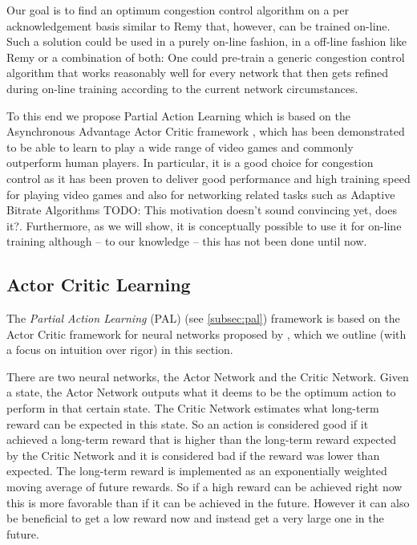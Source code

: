 \documentclass[sigconf]{acmart}
\newcommand\note[2]{{\color{#1}#2}}
\newcommand\todo[1]{{\note{red}{TODO: #1}}}
\begin{document}
Our goal is to find an optimum congestion control algorithm on a per acknowledgement basis similar to Remy that, however, can be trained on-line.  Such a solution could be used in a purely on-line fashion, in a off-line fashion like Remy or a combination of both: One could pre-train a generic congestion control algorithm that works reasonably well for every network that then gets refined during on-line training according to the current network circumstances. 

To this end we propose Partial Action Learning which is based on the Asynchronous Advantage Actor Critic framework \cite{mnih_asynchronous_2016}, which has been demonstrated to be able to learn to play a wide range of video games and commonly outperform human players. In particular, it is a good choice for congestion control as it has been proven to deliver good performance and high training speed for playing video games and also for networking related tasks such as Adaptive Bitrate Algorithms \cite{mao_neural_2017} \todo{This motivation doesn't sound convincing yet, does it?}. Furthermore, as we will show, it is conceptually possible to use it for on-line training although -- to our knowledge -- this has not been done until now. 

\subsection{Actor Critic Learning}
\label{subsec:ac}

The \textit{Partial Action Learning} (PAL) (see \ref{subsec:pal}) framework is based on the Actor Critic framework for neural networks proposed by \citet{mnih_asynchronous_2016}, which we outline (with a focus on intuition over rigor) in this section. 

There are two neural networks, the Actor Network and the Critic Network. Given a state, the Actor Network outputs what it deems to be the optimum action to perform in that certain state. The Critic Network estimates what long-term reward can be expected in this state. So an action is considered good if it achieved a long-term reward that is higher than the long-term reward expected by the Critic Network and it is considered bad if the reward was lower than expected. The long-term reward is implemented as an exponentially weighted moving average of future rewards. So if a high reward can be achieved right now this is more favorable than if it can be achieved in the future. However it can also be beneficial to get a low reward now and instead get a very large one in the future. 
\end{document}
